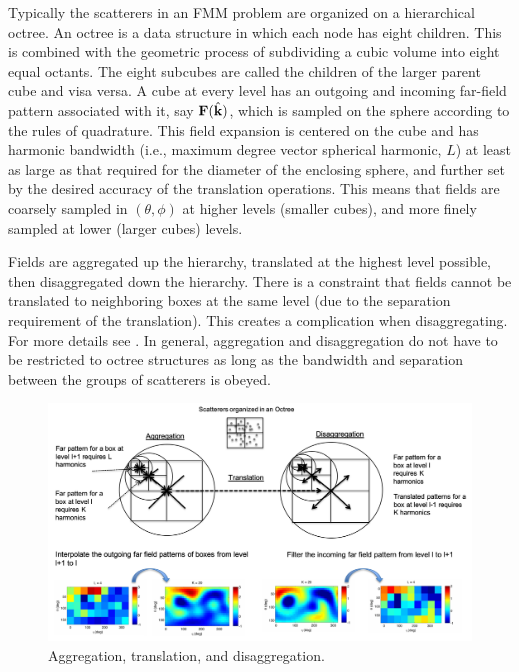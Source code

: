 Typically the scatterers in an FMM problem are organized on a hierarchical octree. An octree is a data structure in which each node has eight children. This is combined with the geometric process of subdividing a cubic volume into eight equal octants. The eight subcubes are called the children of the larger parent cube and visa versa. A cube at every level has an outgoing and incoming far-field pattern associated with it, say $\mathbf{F}(\hat {\mathbf{k}})$, which is sampled on the sphere according to the rules of quadrature. This field expansion is centered on the cube and has harmonic bandwidth (i.e., maximum degree vector spherical harmonic, $L$) at least as large as that required for the diameter of the enclosing sphere, and further set by the desired accuracy of the translation operations. This means that fields are coarsely sampled in $(\theta,\phi)$ at higher levels (smaller cubes), and more finely sampled at lower (larger cubes) levels.

Fields are aggregated up the hierarchy, translated at the highest level possible, then disaggregated down the hierarchy. There is a constraint that fields cannot be translated to neighboring boxes at the same level (due to the separation requirement of the translation). This creates a complication when disaggregating. For more details see \cite{yucel2008helmholtz}. In general, aggregation and disaggregation do not have to be restricted to octree structures as long as the bandwidth and separation between the groups of scatterers is obeyed. 


 \begin{figure}[h] 
   \centering
   \includegraphics[width=6in]{FastMultipoleMethod/Figures/aggdiss} 
   \caption{Aggregation, translation, and disaggregation. }
   \label{}
\end{figure}



